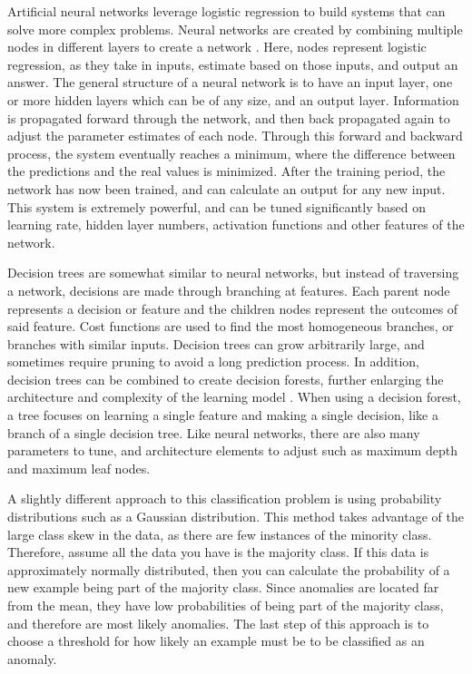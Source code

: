 \documentclass[midd]{thesis}
\begin{document}
Artificial neural networks leverage logistic regression to build systems that can solve more complex problems. Neural networks are created by combining multiple nodes in different layers to create a network \cite{Suryansh}. Here, nodes represent logistic regression, as they take in inputs, estimate based on those inputs, and output an answer. The general structure of a neural network is to have an input layer, one or more hidden layers which can be of any size, and an output layer. Information is propagated forward through the network, and then back propagated again to adjust the parameter estimates of each node. Through this forward and backward process, the system eventually reaches a minimum, where the difference between the predictions and the real values is minimized. After the training period, the network has now been trained, and can calculate an output for any new input. This system is extremely powerful, and can be tuned significantly based on learning rate, hidden layer numbers, activation functions and other features of the network. 

Decision trees are somewhat similar to neural networks, but instead of traversing a network, decisions are made through branching at features. Each parent node represents a decision or feature and the children nodes represent the outcomes of said feature. Cost functions are used to find the most homogeneous branches, or branches with similar inputs. Decision trees can grow arbitrarily large, and sometimes require pruning to avoid a long prediction process. In addition, decision trees can be combined to create decision forests, further enlarging the architecture and complexity of the learning model \cite{Gupta}. When using a decision forest, a tree focuses on learning a single feature and making a single decision, like a branch of a single decision tree. Like neural networks, there are also many parameters to tune, and architecture elements to adjust such as maximum depth and maximum leaf nodes.

A slightly different approach to this classification problem is using probability distributions such as a Gaussian distribution. This method takes advantage of the large class skew in the data, as there are few instances of the minority class. Therefore, assume all the data you have is the majority class. If this data is approximately normally distributed, then you can calculate the probability of a new example being part of the majority class. Since anomalies are located far from the mean, they have low probabilities of being part of the majority class, and therefore are most likely anomalies. The last step of this approach is to choose a threshold for how likely an example must be to be classified as an anomaly. 
\end{document}
